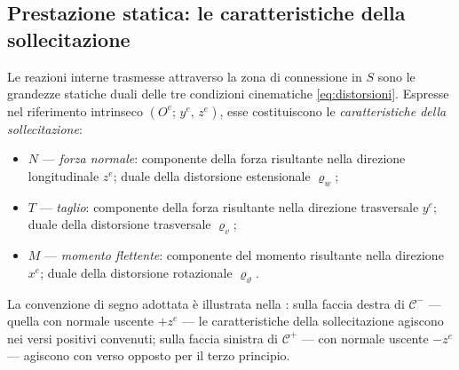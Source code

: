 \subsection{Prestazione statica: le caratteristiche della sollecitazione}
\label{sec:caratteristiche}


Le reazioni interne trasmesse attraverso la zona
di connessione in $S$ sono le grandezze statiche
duali delle tre condizioni cinematiche
\eqref{eq:distorsioni}. Espresse nel riferimento
intrinseco $(O^e;\, y^e,\, z^e)$, esse costituiscono
le \emph{caratteristiche della sollecitazione}:


\begin{itemize}[nosep]
	\item $N$ --- \emph{forza normale}: componente
	della forza risultante nella direzione longitudinale
	$z^e$; duale della distorsione estensionale
	$\varrho_w$;
	\item $T$ --- \emph{taglio}: componente della
	forza risultante nella direzione trasversale
	$y^e$; duale della distorsione trasversale
	$\varrho_v$;
	\item $M$ --- \emph{momento flettente}:
	componente del momento risultante nella
	direzione $x^e$; duale della distorsione
	rotazionale $\varrho_\vartheta$.
\end{itemize}

La convenzione di segno adottata è illustrata
nella : sulla faccia
destra di $\mathcal{C}^-$ --- quella con normale
uscente $+z^e$ --- le caratteristiche della
sollecitazione agiscono nei versi positivi
convenuti; sulla faccia sinistra di $\mathcal{C}^+$
--- con normale uscente $-z^e$ --- agiscono con
verso opposto per il terzo principio.





